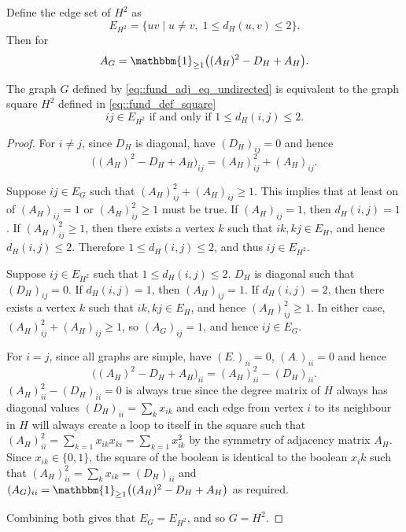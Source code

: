 
Define the edge set of $H^2$ as 
\begin{equation} \label{eq::fund_def_square}
E_{H^2} = \{ uv \mid u \neq v,\; 1 \leq d_H(u,v) \leq 2 \}.
\end{equation}
Then for 
\begin{equation} \label{eq::fund_adj_eq_undirected}
A_G = \mathbbm{1}_{\geq 1}\big((A_H)^2 - D_H + A_H\big).
\end{equation}
\begin{lemma} \label{lemma::G_equal_to_H^2}
  The graph $G$ defined by \eqref{eq::fund_adj_eq_undirected} is equivalent to the graph square $H^2$ defined in \eqref{eq::fund_def_square} 
  \begin{equation} \label{eq::fund_def_square_expanded}
    ij \in E_{H^2} \text{ if and only if } 1 \leq d_H(i,j) \leq 2. 
  \end{equation}
\end{lemma}
\begin{proof} 
  \noindent
  For $i \neq j$, since $D_H$ is diagonal, have $(D_H)_{ij} = 0$ and hence
  \[
  \big((A_H)^2 - D_H + A_H\big)_{ij} = (A_H)^2_{ij} + (A_H)_{ij}.
  \]

  Suppose $ij \in E_G$ such that $(A_H)^2_{ij} + (A_H)_{ij} \geq 1$. This implies that at least on of $(A_H)_{ij} = 1$ or $(A_H)^2_{ij} \geq 1$ must be true. If $(A_H)_{ij} = 1$, then $d_H(i,j) = 1$.  If $(A_H)^2_{ij} \geq 1$, then there exists a vertex $k$ such that $ik, kj \in E_H$, and hence $d_H(i,j) \leq 2$. Therefore $1 \leq d_H(i,j) \leq 2$, and thus $ij \in E_{H^2}$.

  Suppose $ij \in E_{H^2}$ such that $1 \leq d_H(i,j) \leq 2$. $D_H$ is diagonal such that $(D_H)_{ij} = 0$. If $d_H(i,j) = 1$, then $(A_H)_{ij} = 1$. If $d_H(i,j) = 2$, then there exists a vertex $k$ such that $ik, kj \in E_H$, and hence $(A_H)^2_{ij} \geq 1$. In either case, $(A_H)^2_{ij} + (A_H)_{ij} \geq 1$, so $(A_G)_{ij} = 1$, and hence $ij \in E_G$.

  For $i = j$, since all graphs are simple, have $(E_{\cdot})_{ii} = 0$, $(A_{\cdot})_{ii} = 0$ and hence
  \[
  \big((A_H)^2 - D_H + A_H\big)_{ii} = (A_H)^2_{ii} - (D_H)_{ii}.
  \]
  $(A_H)^2_{ii} - (D_H)_{ii} = 0$ is always true since the degree matrix of $H$ always has diagonal values $\displaystyle (D_H)_{ii} = \sum_k x_{ik}$ and each edge from vertex $i$ to its neighbour in $H$ will always create a loop to itself in the square such that $\displaystyle (A_H)^2_{ii} = 
  \sum_{k = 1} x_{ik}x_{ki} = \sum_{k = 1} x_{ik}^2$ by the symmetry of adjacency matrix $A_H$. Since $x_{ik} \in \{0, 1\}$, the square of the boolean is identical to the boolean $x_ik$ such that $\displaystyle (A_H)^2_{ii} = \sum_k x_{ik} = (D_H)_{ii}$ and $(A_G)_{ii} = \mathbbm{1}_{\geq 1}\big((A_H)^2 - D_H + A_H\big)$ as required. 

  Combining both gives that $E_G = E_{H^2}$, and so $G = H^2$.  
\end{proof}

